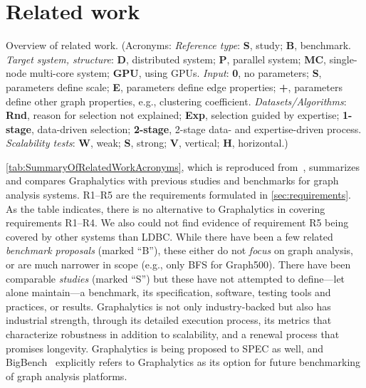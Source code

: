 \chapter{Related work}
\label{chap:related-work}



\begin{table*}[!ht]
	\centering
	\caption[Overview of related work]{Overview of related work. {\small (Acronyms: 
			\emph{Reference type}: {\bf S}, study; {\bf B}, benchmark. \emph{Target system, structure}: {\bf D}, distributed system; {\bf P}, parallel system; {\bf MC},  single-node multi-core system; {\bf GPU}, using GPUs. 
			\emph{Input}: {\bf 0}, no parameters; {\bf S}, parameters define scale; {\bf E}, parameters define edge properties; {\bf +}, parameters define other graph properties, e.g., clustering coefficient.
			\emph{Datasets/Algorithms}: {\bf Rnd}, reason for selection not explained; {\bf Exp}, selection guided by expertise; {\bf 1-stage}, data-driven selection; {\bf 2-stage}, 2-stage data- and expertise-driven process.
			\emph{Scalability tests}: {\bf W}, weak; {\bf S}, strong; {\bf V}, vertical; {\bf H}, horizontal.)}}
	\label{tab:SummaryOfRelatedWorkAcronyms}
	\resizebox{\textwidth}{!}{
		
	}
	
\end{table*}


\autoref{tab:SummaryOfRelatedWorkAcronyms}, which is reproduced from~\cite{DBLP:journals/pvldb/IosupHNHPMCCSATXNB16}, summarizes and compares Graphalytics with previous studies and benchmarks for graph analysis systems. R1--R5 are the requirements formulated in \autoref{sec:requirements}. 
As the table indicates, there is no alternative to Graphalytics in covering requirements R1--R4. We also could not find evidence of requirement R5 being covered by other systems than LDBC.
While there have been a few related \emph{benchmark proposals} (marked ``B''), these either do not {\em focus} on graph analysis, or are much narrower in scope (e.g., only BFS for Graph500).
There have been comparable \emph{studies} (marked ``S'') but these have not attempted to define---let alone maintain---a benchmark, its specification, software, testing tools and practices, or results.
Graphalytics is not only industry-backed but also has industrial strength, through its detailed execution process, its metrics that characterize robustness in addition to scalability, and a renewal process that promises longevity.
Graphalytics is being proposed to SPEC as well, and BigBench~\cite{DBLP:conf/sigmod/GhazalRHRPCJ13,DBLP:conf/sigmod/RablFDJG15} explicitly refers to Graphalytics as its option for future benchmarking of graph analysis platforms. 


